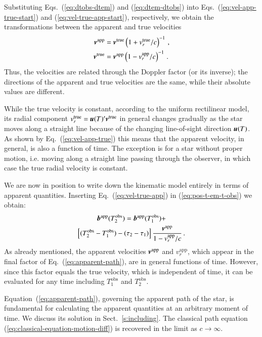 \documentclass{aa}
\def\vec#1{\ensuremath{\mathchoice{\mbox{\boldmath$\displaystyle#1$}}
{\mbox{\boldmath$\textstyle#1$}}
{\mbox{\boldmath$\scriptstyle#1$}}
{\mbox{\boldmath$\scriptscriptstyle#1$}}}}
\begin{document}
Substituting Eqs.~(\ref{eq:dtobs-dtem}) and (\ref{eq:dtem-dtobs}) into Eqs.~(\ref{eq:vel-app-true-start}) and
(\ref{eq:vel-true-app-start}), respectively, we obtain the transformations between the apparent and true velocities
\begin{align}
 \label{eq:vel-app-true}
    \vec{v}^\mathrm{app}
    &=
    \vec{v}^\mathrm{true} \left( 1+v_r^\mathrm{true}/c \right)^{-1} \, , \\
 \label{eq:vel-true-app}
    \vec{v}^\mathrm{true}
    &=
    \vec{v}^\mathrm{app} \left( 1-v_r^\mathrm{app}/c \right)^{-1} \, .
\end{align}
Thus, the velocities are related through the Doppler factor (or its inverse);
the directions of the apparent and true velocities are the same, while their
absolute values are different.

While the true velocity is constant, according to the uniform rectilinear model,
its radial component $v_r^\mathrm{true}=\vec{u}(T)'\vec{v}^\mathrm{true}$
in general changes gradually as the star moves along a straight line because of the
changing line-of-sight direction $\vec{u}(T)$. As shown by Eq.~(\ref{eq:vel-app-true})
this means that the apparent velocity, in general, is also a function of time.
The exception is for a star without proper motion, i.e. moving along a straight
line passing through the observer, in which case the true radial velocity is constant.

We are now in position to write down the kinematic model entirely in terms of
apparent quantities. Inserting Eq.~(\ref{eq:vel-true-app}) in (\ref{eq:pos-t-em-t-obs})
we obtain:
\begin{multline}\label{eq:apparent-path}
    \vec{b}^\mathrm{app}(T_2^\mathrm{obs})
    =
    \vec{b}^\mathrm{app}(T_1^\mathrm{obs})
    + \\
    \left[ (T_2^\mathrm{obs}-T_1^\mathrm{obs}) - (\tau_2-\tau_1) \right]
    \frac{\vec{v}^\mathrm{app}}{1-v_r^\mathrm{app}/c} \, .
\end{multline}
As already mentioned, the apparent velocities $\vec{v}^\mathrm{app}$ and
$v_r^\mathrm{app}$, which appear in the final factor of Eq.~(\ref{eq:apparent-path}),
are in general functions of time. However, since this factor equals the true velocity,
which is independent of time, it can be evaluated for any time including
$T_1^\mathrm{obs}$ and $T_2^\mathrm{obs}$.

Equation~(\ref{eq:apparent-path}), governing the apparent path of the star, is
fundamental for calculating the apparent quantities at an arbitrary moment of time.
We discuss its solution in Sect.~\ref{s:including}. The classical path equation
(\ref{eq:classical-equation-motion-diff}) is recovered in the limit as $c\to\infty$.
\end{document}
